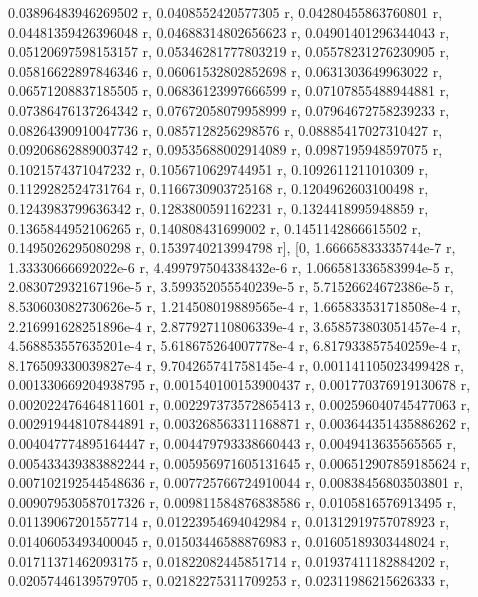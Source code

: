 \documentclass[a4paper,10pt]{article}
\begin{document}
\begin{eulernotebook}
\begin{eulercomment}
\begin{eulercomment}
\begin{eulercomment}
\begin{eulercomment}
\begin{eulercomment}
\begin{eulercomment}
\begin{eulercomment}
\begin{eulercomment}
\begin{eulercomment}
\begin{eulercomment}
\begin{eulercomment}
\begin{eulercomment}
\begin{eulercomment}
\begin{eulercomment}
\begin{eulercomment}
\begin{eulercomment}
\begin{eulercomment}
\begin{eulercomment}
\begin{eulercomment}
\begin{eulercomment}
\begin{eulercomment}
\begin{eulercomment}
\begin{eulercomment}
\begin{eulercomment}
\begin{eulercomment}
\begin{eulercomment}
\begin{eulercomment}
\begin{eulercomment}
\begin{euleroutput}
  0.03896483946269502 r, 0.0408552420577305 r, 0.04280455863760801 r, 
  0.04481359426396048 r, 0.04688314802656623 r, 0.04901401296344043 r, 
  0.05120697598153157 r, 0.05346281777803219 r, 0.05578231276230905 r, 
  0.05816622897846346 r, 0.06061532802852698 r, 0.0631303649963022 r, 
  0.06571208837185505 r, 0.06836123997666599 r, 0.07107855488944881 r, 
  0.07386476137264342 r, 0.07672058079958999 r, 0.07964672758239233 r, 
  0.08264390910047736 r, 0.0857128256298576 r, 0.08885417027310427 r, 
  0.09206862889003742 r, 0.09535688002914089 r, 0.0987195948597075 r, 
  0.1021574371047232 r, 0.1056710629744951 r, 0.1092611211010309 r, 
  0.1129282524731764 r, 0.1166730903725168 r, 0.1204962603100498 r, 
  0.1243983799636342 r, 0.1283800591162231 r, 0.1324418995948859 r, 
  0.1365844952106265 r, 0.140808431699002 r, 0.1451142866615502 r, 
  0.1495026295080298 r, 0.1539740213994798 r], 
  [0, 1.66665833335744e-7 r, 1.33330666692022e-6 r, 
  4.499797504338432e-6 r, 1.066581336583994e-5 r, 
  2.083072932167196e-5 r, 3.599352055540239e-5 r, 
  5.71526624672386e-5 r, 8.530603082730626e-5 r, 
  1.214508019889565e-4 r, 1.665833531718508e-4 r, 
  2.216991628251896e-4 r, 2.877927110806339e-4 r, 
  3.658573803051457e-4 r, 4.568853557635201e-4 r, 
  5.618675264007778e-4 r, 6.817933857540259e-4 r, 
  8.176509330039827e-4 r, 9.704265741758145e-4 r, 
  0.001141105023499428 r, 0.001330669204938795 r, 
  0.001540100153900437 r, 0.001770376919130678 r, 
  0.002022476464811601 r, 0.002297373572865413 r, 
  0.002596040745477063 r, 0.002919448107844891 r, 
  0.003268563311168871 r, 0.003644351435886262 r, 
  0.004047774895164447 r, 0.004479793338660443 r, 0.0049413635565565 r, 
  0.005433439383882244 r, 0.005956971605131645 r, 
  0.006512907859185624 r, 0.007102192544548636 r, 
  0.007725766724910044 r, 0.00838456803503801 r, 
  0.009079530587017326 r, 0.009811584876838586 r, 0.0105816576913495 r, 
  0.01139067201557714 r, 0.01223954694042984 r, 0.01312919757078923 r, 
  0.01406053493400045 r, 0.01503446588876983 r, 0.01605189303448024 r, 
  0.01711371462093175 r, 0.01822082445851714 r, 0.01937411182884202 r, 
  0.02057446139579705 r, 0.02182275311709253 r, 0.02311986215626333 r, 

\end{euleroutput}
\end{eulercomment}
\end{eulercomment}
\end{eulercomment}
\end{eulercomment}
\end{eulercomment}
\end{eulercomment}
\end{eulercomment}
\end{eulercomment}
\end{eulercomment}
\end{eulercomment}
\end{eulercomment}
\end{eulercomment}
\end{eulercomment}
\end{eulercomment}
\end{eulercomment}
\end{eulercomment}
\end{eulercomment}
\end{eulercomment}
\end{eulercomment}
\end{eulercomment}
\end{eulercomment}
\end{eulercomment}
\end{eulercomment}
\end{eulercomment}
\end{eulercomment}
\end{eulercomment}
\end{eulercomment}
\end{eulercomment}
\end{eulernotebook}
\end{document}
